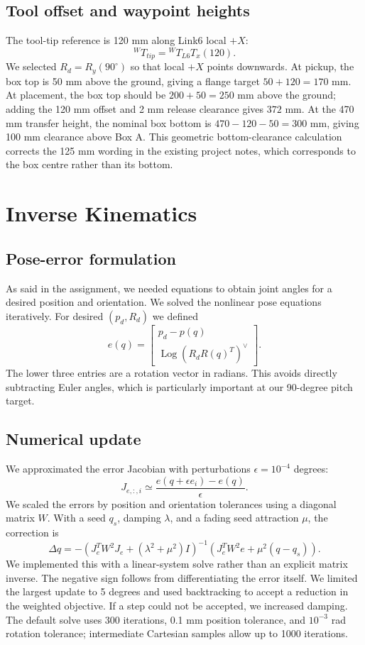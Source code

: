 \documentclass[11pt,a4paper]{report}
\begin{document}
\section{Tool offset and waypoint heights}
The tool-tip reference is 120 mm along Link6 local $+X$:
\begin{equation}{}^WT_{tip}={}^WT_{L6}T_x(120).\end{equation}
We selected $R_d=R_y(90^\circ)$ so that local $+X$ points downwards. At pickup, the box top is 50 mm above the ground, giving a flange target $50+120=170$ mm. At placement, the box top should be $200+50=250$ mm above the ground; adding the 120 mm offset and 2 mm release clearance gives $372$ mm. At the 470 mm transfer height, the nominal box bottom is $470-120-50=300$ mm, giving 100 mm clearance above Box A. This geometric bottom-clearance calculation corrects the 125 mm wording in the existing project notes, which corresponds to the box centre rather than its bottom.
\chapter{Inverse Kinematics}
\section{Pose-error formulation}
As said in the assignment, we needed equations to obtain joint angles for a desired position and orientation. We solved the nonlinear pose equations iteratively. For desired $(p_d,R_d)$ we defined
\begin{equation}
e(q)=\begin{bmatrix}p_d-p(q)\\\operatorname{Log}(R_dR(q)^T)^\vee\end{bmatrix}.
\end{equation}
The lower three entries are a rotation vector in radians. This avoids directly subtracting Euler angles, which is particularly important at our 90-degree pitch target.
\section{Numerical update}
We approximated the error Jacobian with perturbations $\epsilon=10^{-4}$ degrees:
\begin{equation}J_{e,:,i}\simeq\frac{e(q+\epsilon e_i)-e(q)}{\epsilon}.\end{equation}
We scaled the errors by position and orientation tolerances using a diagonal matrix $W$. With a seed $q_s$, damping $\lambda$, and a fading seed attraction $\mu$, the correction is
\begin{equation}
\Delta q=-\left(J_e^TW^2J_e+(\lambda^2+\mu^2)I\right)^{-1}
\left(J_e^TW^2e+\mu^2(q-q_s)\right).
\end{equation}
We implemented this with a linear-system solve rather than an explicit matrix inverse. The negative sign follows from differentiating the error itself. We limited the largest update to 5 degrees and used backtracking to accept a reduction in the weighted objective. If a step could not be accepted, we increased damping. The default solve uses 300 iterations, 0.1 mm position tolerance, and $10^{-3}$ rad rotation tolerance; intermediate Cartesian samples allow up to 1000 iterations.
\end{document}
